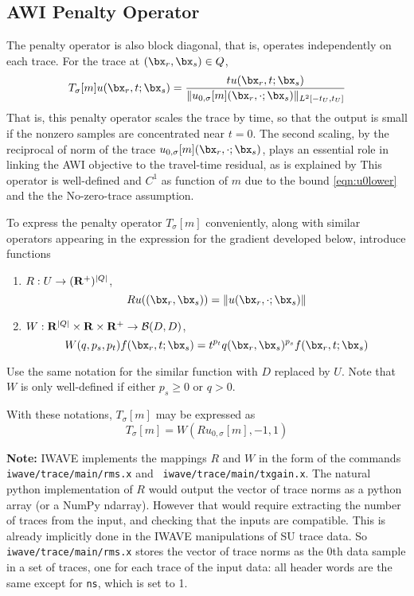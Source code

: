 \subsection{AWI Penalty Operator}
The penalty operator is also block diagonal, that is, operates independently on each trace. For the trace at $(\bx_r,\bx_s) \in Q$, 
\begin{equation}
  \label{eqn:ppf}
  T_{\sigma}[m]u (\bx_r,t;\bx_s) = \frac{t u(\bx_r,t;\bx_s)}{\|u_{0,\sigma}[m](\bx_r,\cdot; \bx_s)\|_{L^2[-t_U,t_U]} }
\end{equation}
That is, this penalty operator scales the trace by time, so that the output is small if the nonzero samples are concentrated near $t=0$. The second scaling, by the reciprocal of norm of the trace $u_{0,\sigma}[m](\bx_r,\cdot;\bx_s)$, plays an essential role in linking the AWI objective to the travel-time residual, as is explained by \cite{HCSMWS:23a}
This operator is well-defined and $C^1$ as function of $m$ due to the
bound \ref{eqn:u0lower} and the the No-zero-trace assumption.

To express the penalty operator $T_{\sigma}[m]$ conveniently, along
with similar operators appearing in the expression for the gradient
developed below, introduce functions
\begin{enumerate}
\item $R: U \rightarrow ({\bf R}^{+})^{|Q|}$,
  \[
    Ru((\bx_r,\bx_s)) = \|u(\bx_r, \cdot;\bx_s)\|
  \]
\item $W: {\bf R}^{|Q|} \times {\bf R} \times {\bf R}^{+}
  \rightarrow {\cal B}(D,D)$,
  \[
    W(q,p_s, p_t)f (\bx_r,t;\bx_s) = t^{p_t}
    q(\bx_r,\bx_s)^{p_s}f(\bx_r,t;\bx_s)
  \]
\end{enumerate}
Use the same notation for the similar function with $D$ replaced by
$U$. Note that $W$ is only well-defined if either $p_s \ge 0$ or $q>0$.

With these notations, $T_{\sigma}[m]$ may be expressed as
\begin{equation}
  \label{eqn:talt}
  T_{\sigma}[m] = W(Ru_{0,\sigma}[m],-1, 1)
\end{equation}

{\bf Note:} IWAVE implements the mappings $R$ and $W$ in the form of
the commands {\tt iwave/trace/main/rms.x} and {\tt
  iwave/trace/main/txgain.x}. The natural python implementation of $R$
would output the vector of trace norms as a python array (or a NumPy
ndarray). However that would require extracting the number of traces
from the input, and checking that the inputs are compatible. This is
already implicitly done in the IWAVE manipulations of SU trace
data. So {\tt iwave/trace/main/rms.x} stores the vector of trace norms
as the 0th data sample in a set of traces, one for each trace of the
input data: all header words are the same except for {\tt ns}, which
is set to 1.

